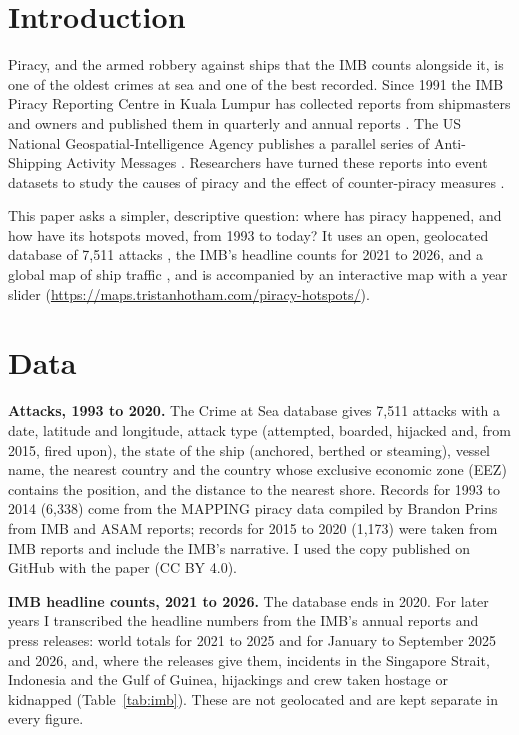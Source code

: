 \documentclass[11pt,a4paper]{article}
\begin{document}
\section{Introduction}
Piracy, and the armed robbery against ships that the IMB counts alongside it, is one of the oldest crimes at sea and one of the best recorded. Since 1991 the IMB Piracy Reporting Centre in Kuala Lumpur has collected reports from shipmasters and owners and published them in quarterly and annual reports \citep{imb}. The US National Geospatial-Intelligence Agency publishes a parallel series of Anti-Shipping Activity Messages \citep{asam}. Researchers have turned these reports into event datasets to study the causes of piracy \citep{coggins,daxecker} and the effect of counter-piracy measures \citep{shortland,bueger}.

This paper asks a simpler, descriptive question: where has piracy happened, and how have its hotspots moved, from 1993 to today? It uses an open, geolocated database of 7,511 attacks \citep{benden}, the IMB's headline counts for 2021 to 2026, and a global map of ship traffic \citep{wbships}, and is accompanied by an interactive map with a year slider (\url{https://maps.tristanhotham.com/piracy-hotspots/}).

\section{Data}
\textbf{Attacks, 1993 to 2020.} The Crime at Sea database \citep{benden} gives 7,511 attacks with a date, latitude and longitude, attack type (attempted, boarded, hijacked and, from 2015, fired upon), the state of the ship (anchored, berthed or steaming), vessel name, the nearest country and the country whose exclusive economic zone (EEZ) contains the position, and the distance to the nearest shore. Records for 1993 to 2014 (6,338) come from the MAPPING piracy data compiled by Brandon Prins from IMB and ASAM reports; records for 2015 to 2020 (1,173) were taken from IMB reports and include the IMB's narrative. I used the copy published on GitHub with the paper (CC BY 4.0).

\textbf{IMB headline counts, 2021 to 2026.} The database ends in 2020. For later years I transcribed the headline numbers from the IMB's annual reports and press releases: world totals for 2021 to 2025 and for January to September 2025 and 2026, and, where the releases give them, incidents in the Singapore Strait, Indonesia and the Gulf of Guinea, hijackings and crew taken hostage or kidnapped (Table~\ref{tab:imb}). These are not geolocated and are kept separate in every figure.
\end{document}
